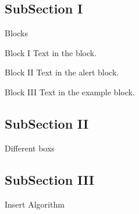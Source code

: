 \documentclass{libs/ufc_format}
\begin{document}
\subsection{SubSection I}
\begin{frame}{Blocks}
    \begin{block}{Block I}
        Text in the block.
    \end{block}

    \begin{alertblock}{Block II}
        Text in the alert block.
    \end{alertblock}

    \begin{exampleblock}{Block III}
        Text in the example block.
    \end{exampleblock}   
\end{frame}

\subsection{SubSection II}
\begin{frame}{Different boxs}

    \pause


    \pause

\end{frame}

\subsection{SubSection III}
\begin{frame}{Insert Algorithm}
    \begin{algorithm}[H]
        \SetAlgoLined
        \LinesNumbered
         \caption{Algorithm Example}
    \end{algorithm}
\end{frame}
\end{document}

